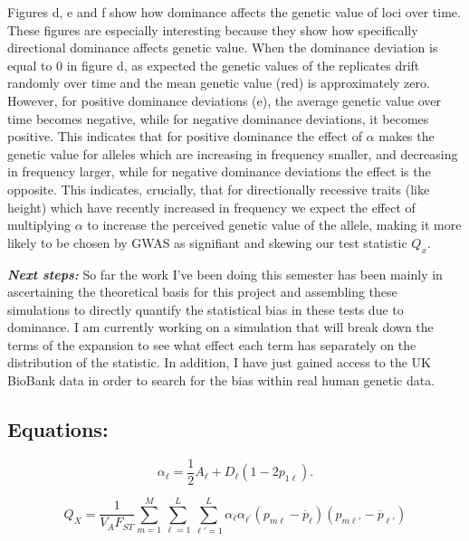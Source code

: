 \documentclass[a4paper,11pt]{article}
\begin{document}
Figures d, e and f show how dominance affects the genetic
value of loci over time. These figures are especially
interesting because they show how specifically directional dominance
affects genetic value. When the dominance deviation is equal to 0
in figure d, as expected the genetic values of the replicates drift
randomly over time and the mean genetic value (red) is approximately
zero. However, for positive dominance deviations (e), the average
genetic value over time becomes negative, while for negative dominance
deviations, it becomes positive. This indicates that for positive
dominance the effect of $\alpha$ makes the genetic value for alleles
which are increasing in frequency smaller, and decreasing in frequency
larger, while for negative dominance deviations the effect is the
opposite. This indicates, crucially, that for directionally recessive
traits (like height) which have recently increased in frequency we
expect the effect of multiplying $\alpha$ to increase the perceived
genetic value of the allele, making it more likely to be chosen by GWAS as signifiant and skewing our test statistic $Q_x$.   

\textbf{\emph{Next steps:}} So far the work I've been doing this semester has been mainly in
ascertaining the theoretical basis for this project and
assembling these simulations to directly quantify the statistical bias
in these tests due to dominance. I am currently working on a
simulation that will break down the terms of the expansion to see what
effect each term has separately on the distribution of the
statistic. In addition, I have just gained access to the UK BioBank
data in order to search for the bias within real human genetic data. 

\pagebreak 





\subsection*{Equations:}

\begin{equation}  
  \alpha_\ell = \frac{1}{2} A_\ell + D_\ell\left(1-2p_{1\ell}\right).
  \label{avgeff}
\end{equation}

\begin{equation}
  Q_X = \frac{1}{V_A F_{ST}} \sum_{m=1}^M \sum_{\ell=1}^L
  \sum_{\ell\prime=1}^L \alpha_{\ell}
  \alpha_{\ell^{\prime}}\left(p_{m\ell} - \overline{p}_\ell
  \right)\left(p_{m \ell\prime} - \overline{p}_{\ell\prime}\right)
   \label{Qxraw}
\end{equation}
\end{document}
